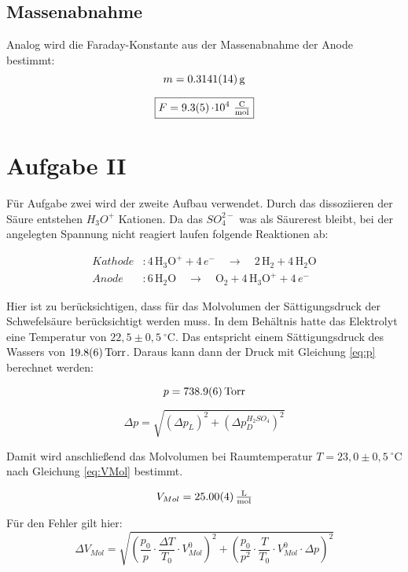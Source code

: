 \subsection{Massenabnahme}
Analog wird die Faraday-Konstante aus der Massenabnahme der Anode bestimmt:
\[ m = \SI{0,3141 \pm 0,0014}{\gram}\]

\[\boxed{F = \SI{9,3\pm 0,5}{\cdot 10^{4}\ \tfrac{\coulomb}{\mole}}}\]



\section{Aufgabe II}

Für Aufgabe zwei wird der zweite Aufbau verwendet. Durch das dissoziieren der Säure entstehen $H_3O^+$ Kationen. Da das $SO_4^{2-}$ was als Säurerest bleibt,
bei der angelegten Spannung nicht reagiert laufen folgende Reaktionen ab:

\begin{align*}
Kathode&: 4\,\mathrm{H_3O^+} + 4\,e^- \quad\rightarrow \quad2\,\mathrm{H_2} + 4\,\mathrm{H_2O} \\
Anode&: 6\,\mathrm{H_2O} \quad \rightarrow \quad\mathrm{O_2} + 4\,\mathrm{H_3O^+} + 4\,e^-
\end{align*}




Hier ist zu berücksichtigen, dass für das Molvolumen der Sättigungsdruck der Schwefelsäure berücksichtigt werden muss.
In dem Behältnis hatte das Elektrolyt eine Temperatur von $22,5 \pm 0,5\ ^\circ \text{C}$. Das entspricht einem Sättigungsdruck des Wassers von $\SI{19,8 \pm 0,6}{\text{Torr}}$.
Daraus kann dann der Druck mit Gleichung \ref{eq:p} berechnet werden:

\[ p = \SI{738.9 \pm 0.6}{\text{Torr} }\]

\begin{equation}
    \Delta p = \sqrt{(\Delta p_L)^2 + (\Delta p_D^{H_2SO_4})^2}
\end{equation}

Damit wird anschließend das Molvolumen bei Raumtemperatur $T = 23,0 \pm 0,5\ ^\circ \text{C}$ nach Gleichung \ref{eq:VMol} bestimmt.

\[V_{Mol} = \SI{25,00 \pm 0.04}{\tfrac{\litre}{\mole}}\]

Für den Fehler gilt hier:
\begin{equation}
    \Delta V_{Mol} = \sqrt{\left(\frac{p_0}{p} \cdot \frac{\Delta T}{T_0} \cdot V_{Mol}^0\right)^2 + \left(\frac{p_0}{p^2} \cdot \frac{T}{T_0} \cdot V_{Mol}^0\cdot  \Delta p\right)^2}
\end{equation}

